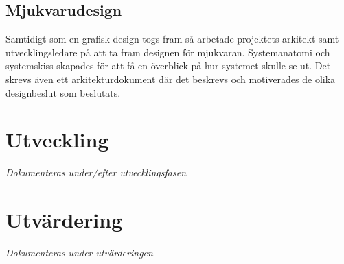 \subsection{Mjukvarudesign}
Samtidigt som en grafisk design togs fram så arbetade projektets arkitekt samt utvecklingsledare på att ta fram designen för mjukvaran. Systemanatomi och systemskiss skapades för att få en överblick på hur systemet skulle se ut. Det skrevs även ett arkitekturdokument där det beskrevs och motiverades de olika designbeslut som beslutats.

\section{Utveckling}
\textit{Dokumenteras under/efter utvecklingsfasen}

\section{Utvärdering}
\textit{Dokumenteras under utvärderingen}
